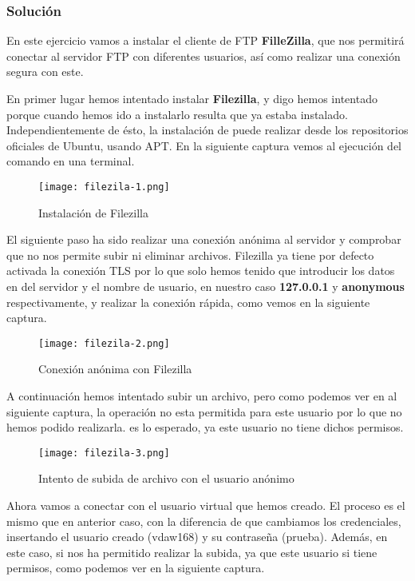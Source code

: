 \subsubsection{Solución}
En este ejercicio vamos a instalar el cliente de FTP \textbf{FilleZilla}, que nos permitirá conectar al servidor FTP con diferentes usuarios, así como realizar una conexión segura con este.

En primer lugar hemos intentado instalar \textbf{Filezilla}, y digo hemos intentado porque cuando hemos ido a instalarlo resulta que ya estaba instalado. Independientemente de ésto, la instalación de puede realizar desde los repositorios oficiales de Ubuntu, usando APT. En la siguiente captura vemos al ejecución del comando en una terminal.

\begin{figure}[H]
    \centering
    \texttt{[image: filezila-1.png]}
    \caption{Instalación de Filezilla}
\end{figure}

El siguiente paso ha sido realizar una conexión anónima al servidor y comprobar que no nos permite subir ni eliminar archivos. Filezilla ya tiene por defecto activada la conexión TLS por lo que solo hemos tenido que introducir los datos en del servidor y el nombre de usuario, en nuestro caso \textbf{127.0.0.1} y \textbf{anonymous} respectivamente, y realizar la conexión rápida, como vemos en la siguiente captura.

\begin{figure}[H]
    \centering
    \texttt{[image: filezila-2.png]}
    \caption{Conexión anónima con Filezilla}
\end{figure}

A continuación hemos intentado subir un archivo, pero como podemos ver en al siguiente captura, la operación no esta permitida para este usuario por lo que no hemos podido realizarla. es lo esperado, ya este usuario no tiene dichos permisos.

\begin{figure}[H]
    \centering
    \texttt{[image: filezila-3.png]}
    \caption{Intento de subida de archivo con el usuario anónimo}
\end{figure}

Ahora vamos a conectar con el usuario virtual que hemos creado. El proceso es el mismo que en anterior caso, con la diferencia de que cambiamos los credenciales, insertando el usuario creado (vdaw168) y su contraseña (prueba). Además, en este caso, si nos ha permitido realizar la subida, ya que este usuario si tiene permisos, como podemos ver en la siguiente captura.

